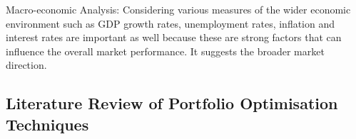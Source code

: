 \documentclass[a4paper,12pt]{report}
\numberwithin{equation}{section}
\theoremstyle{definition}
\begin{document}
Macro-economic Analysis: Considering various measures of the wider economic environment such as GDP growth rates, unemployment rates, inflation and interest rates are important as well because these are strong factors that can influence the overall market performance. It suggests the broader market direction.

\begin{landscape}
\titlespacing{\chapter}{53pt}{-70pt}{1cm}%
\chapter{Literature Review of Portfolio Optimisation Techniques}

\def\fillandplacepagenumber{%
 \par\pagestyle{empty}%
 \vbox to 0pt{\vss}\vfill
 \vbox to 0pt{\baselineskip0pt
   \hbox to\linewidth{\hss}%
   \baselineskip\footskip
   \hbox to\linewidth{%
     \hfil\thepage\hfil}\vss}}


  
  \titlespacing{\section}{0pt}{-150pt}{0cm}%

\end{landscape}
\end{document}
